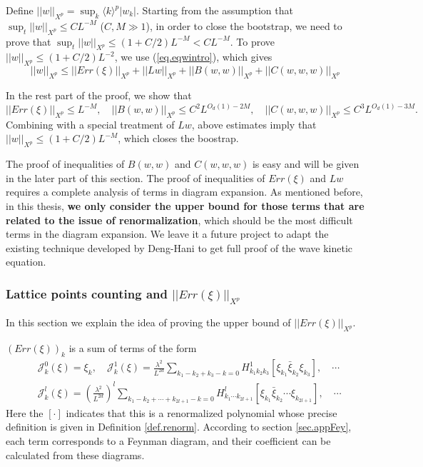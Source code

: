 Define $||w||_{X^p}=\sup_{k} \langle k\rangle^{p} |w_k|$. Starting from the assumption that $\sup_t||w||_{X^p}\le CL^{-M}$ ($C,M\gg 1$), in order to close the bootstrap, we need to prove that $\sup_t||w||_{X^p}\le (1+C/2)L^{-M}<CL^{-M}$. To prove $||w||_{X^p}\le (1+C/2)L^{-2}$, we use (\ref{eq.eqwintro}), which gives
\begin{equation}\label{eq.ineqw}
 ||w||_{X^p}\le ||Err(\xi)||_{X^p}+||Lw||_{X^p}+||B(w,w)||_{X^p}+||C(w,w,w)||_{X^p}
\end{equation}

In the rest part of the proof, we show that 
\begin{equation}
 ||Err(\xi)||_{X^p}\le L^{-M},
 \quad ||B(w,w)||_{X^p}\le C^2L^{O_d(1)-2M},
 \quad||C(w,w,w)||_{X^p}\le C^3L^{O_d(1)-3M}.
\end{equation}
Combining with a special treatment of $Lw$, above estimates imply that $||w||_{X^p}\le (1+C/2)L^{-M}$, which closes the boostrap.

The proof of inequalities of $B(w,w)$ and $C(w,w,w)$ is easy and will be given in the later part of this section. The proof of inequalities of $Err(\xi)$ and $Lw$ requires a complete analysis of terms in diagram expansion. As mentioned before, in this thesis, \textbf{we only consider the upper bound for those terms that are related to the issue of renormalization}, which should be the most difficult terms in the diagram expansion. We leave it a future project to adapt the existing technique developed by Deng-Hani to get full proof of the wave kinetic equation.


\subsubsection{Lattice points counting and $||Err(\xi)||_{X^p}$}\label{sec.latticeintro} In this section we explain the idea of proving the upper bound of $||Err(\xi)||_{X^p}$.

$(Err(\xi))_{k}$ is a sum of terms of the form
\begin{equation}\label{eq.Errsumterms}
\begin{split}
 &\mathcal{J}_k^0(\xi)= \xi_k, \quad \mathcal{J}_k^1(\xi)=\frac{\lambda^2}{L^{2d}} \sum_{k_1-k_2+k_3-k=0} H^1_{k_1k_2k_3} [\xi_{k_1}\bar{\xi}_{k_2}\xi_{k_3}] , \quad\cdots \\
 &\mathcal{J}_k^l(\xi)=\left(\frac{\lambda^2}{L^{2d}}\right)^l\sum_{k_1-k_2+\cdots+k_{2l+1}-k=0} H^l_{k_1\cdots k_{2l+1}} [\xi_{k_1}\bar{\xi}_{k_2}\cdots\xi_{k_{2l+1}}], \quad\cdots 
\end{split}
\end{equation}
Here the $[\cdot]$ indicates that this is a renormalized polynomial whose precise definition is given in Definition \ref{def.renorm}. According to section \ref{sec.appFey}, each term corresponds to a Feynman diagram, and their coefficient can be calculated from these diagrams. 

